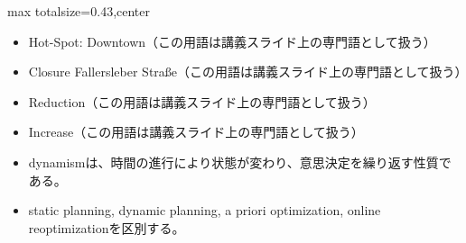 \clearpage
{}
\begin{minipage}[t]{0.405\textwidth}
\begin{adjustbox}{max totalsize={\textwidth}{0.43\textheight},center}
\begin{minipage}{\textwidth}\scriptsize
{}\begin{itemize}
\item Hot-Spot: Downtown（この用語は講義スライド上の専門語として扱う）
\item Closure Fallersleber Straße（この用語は講義スライド上の専門語として扱う）
\item Reduction（この用語は講義スライド上の専門語として扱う）
\item Increase（この用語は講義スライド上の専門語として扱う）
\end{itemize}\begin{itemize}
\item dynamismは、時間の進行により状態が変わり、意思決定を繰り返す性質である。
\item static planning, dynamic planning, a priori optimization, online reoptimizationを区別する。
\end{itemize}
\end{minipage}
\end{adjustbox}
\end{minipage}\hfill
